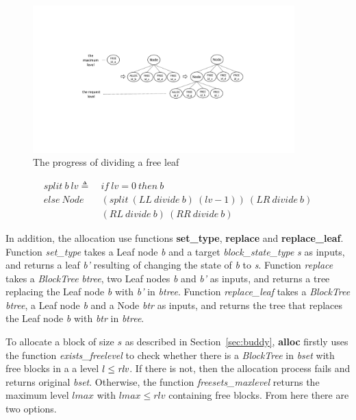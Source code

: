 \begin{figure}[htbp]
	\centering
	\includegraphics[width=0.9\textwidth]{fig1.pdf}
	\caption{The progress of dividing a free leaf}
	\label{fig:splitleaf}
\end{figure}

\begin{definition} 
\end{definition}
\vspace{-7pt}
{\footnotesize
\begin{align*}
split\ b\ lv \triangleq\ &if\ lv = 0\ then\ b \\
else\ Node\ &(split\ (LL\ divide\ b)\ (lv - 1))\ (LR\ divide\ b)\\ 
&(RL\ divide\ b)\ (RR\ divide\ b)
\end{align*}
}	
\vspace{-12pt}

In addition, the allocation use functions \textbf{set\_type}, \textbf{replace} and \textbf{replace\_leaf}. Function \emph{set\_type} takes a Leaf node \emph{b} and a target \emph{block\_state\_type} \emph{s} as inputs, and returns a leaf \emph{b'} resulting of changing the state of \emph{b} to \emph{s}. Function \emph{replace} takes a \emph{BlockTree} \emph{btree}, two Leaf nodes \emph{b} and \emph{b'} as inputs, and returns a tree replacing the Leaf node \emph{b} with \emph{b'} in \emph{btree}. Function \emph{replace\_leaf} takes a \emph{BlockTree} \emph{btree}, a Leaf node \emph{b} and a Node \emph{btr} as inputs, and returns the tree that replaces the Leaf node \emph{b} with \emph{btr} in \emph{btree}.


To allocate a block of size $s$ as described in Section~\ref{sec:buddy}, \textbf{alloc} firstly uses the function \emph{exists\_freelevel} to check whether there is a \emph{BlockTree} in \emph{bset} with free blocks in a a level $l \leq \emph{rlv}$. If there is not, then the allocation process fails and returns original \emph{bset}.  Otherwise, the function \emph{freesets\_maxlevel} returns the maximum level $lmax$ with $lmax \leq rlv$ containing free blocks. From here there are two options.

